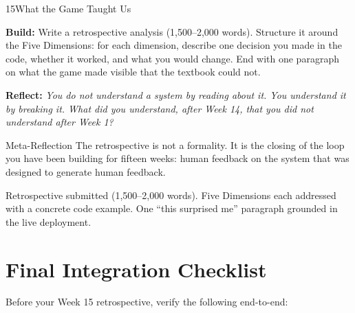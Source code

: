 \documentclass[
  11pt,
  oneside,
  DIV=12,
]{scrartcl}
\newcommand{\build}[1]{\textbf{\color{SpringMoss}Build:} #1}
\newcommand{\reflect}[1]{\textbf{\color{ConceptBlue}Reflect:} \textit{#1}}
\begin{document}
\begin{milestone}{15}{What the Game Taught Us}

\build{Write a retrospective analysis (1,500--2,000 words). Structure it
around the Five Dimensions: for each dimension, describe one decision you
made in the code, whether it worked, and what you would change. End with
one paragraph on what the game made visible that the textbook could not.}

\medskip
\reflect{You do not understand a system by reading about it.
You understand it by breaking it.
What did you understand, after Week 14, that you did not understand
after Week 1?}

\begin{hitlconcept}{Meta-Reflection}
  The retrospective is not a formality. It is the closing of the loop
  you have been building for fifteen weeks: human feedback on the system
  that was designed to generate human feedback.
\end{hitlconcept}

\begin{checkpoint}
  Retrospective submitted (1,500--2,000 words).
  Five Dimensions each addressed with a concrete code example.
  One ``this surprised me'' paragraph grounded in the live deployment.
\end{checkpoint}

\end{milestone}

\clearpage

\section*{Final Integration Checklist}

Before your Week 15 retrospective, verify the following end-to-end:
\end{document}
